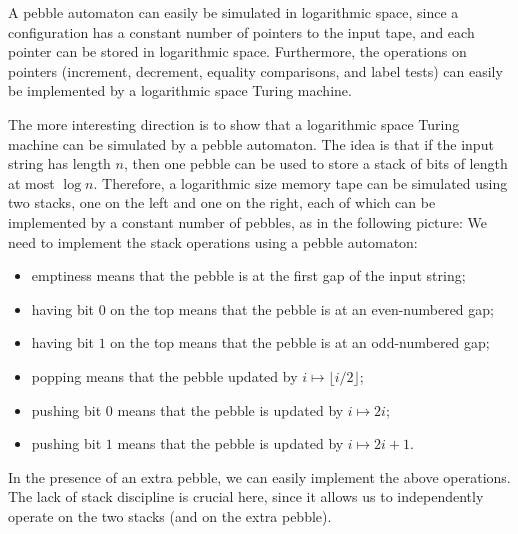 \exerciseheader

 { 
A pebble automaton can easily be simulated in logarithmic space, since a configuration has a constant number of pointers to the input tape, and each pointer can be stored in logarithmic space. Furthermore, the operations on pointers (increment, decrement, equality comparisons, and label tests) can easily be implemented by a logarithmic space Turing machine.  

The more interesting direction is to show that a logarithmic space Turing machine can be simulated by a pebble automaton. The idea is that if the input string has length $n$, then one pebble can be used to store a stack of bits of length at most $\log n$. Therefore, a logarithmic size memory tape can be simulated using two stacks, one on the left and one on the right, each of which can be implemented by a constant number of pebbles, as in the following picture:
  We need to implement the stack operations using a pebble automaton:
\begin{itemize}
    \item emptiness means that the pebble is at the first gap of the input string;
    \item having bit $0$ on the top means that the pebble is at an even-numbered gap;
    \item having bit $1$ on the top means that the pebble is at an odd-numbered gap;
    \item popping means that the pebble updated by $i \mapsto \lfloor i/2 \rfloor$;
    \item pushing bit $0$ means that the pebble is updated by $i \mapsto 2i$;
    \item pushing bit $1$ means that the pebble is updated by $i \mapsto 2i+1$.
\end{itemize}
In the presence of an extra pebble, we can easily implement the above operations. The lack of stack discipline is crucial here, since it allows us to independently operate on the two stacks (and on the extra pebble).
}